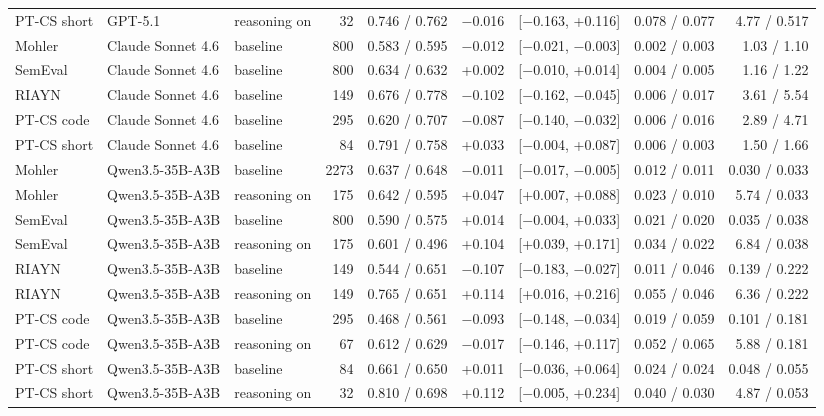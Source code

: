 \documentclass[10pt]{article}
\begin{document}
\begin{longtable}{lllrrrlrr}
PT-CS short & GPT-5.1 & reasoning on & 32 & 0.746 / 0.762 & $-$0.016 & [$-$0.163, +0.116] & 0.078 / 0.077 & 4.77 / 0.517 \\
Mohler & Claude Sonnet 4.6 & baseline & 800 & 0.583 / 0.595 & $-$0.012 & [$-$0.021, $-$0.003] & 0.002 / 0.003 & 1.03 / 1.10 \\
SemEval & Claude Sonnet 4.6 & baseline & 800 & 0.634 / 0.632 & +0.002 & [$-$0.010, +0.014] & 0.004 / 0.005 & 1.16 / 1.22 \\
RIAYN & Claude Sonnet 4.6 & baseline & 149 & 0.676 / 0.778 & $-$0.102 & [$-$0.162, $-$0.045] & 0.006 / 0.017 & 3.61 / 5.54 \\
PT-CS code & Claude Sonnet 4.6 & baseline & 295 & 0.620 / 0.707 & $-$0.087 & [$-$0.140, $-$0.032] & 0.006 / 0.016 & 2.89 / 4.71 \\
PT-CS short & Claude Sonnet 4.6 & baseline & 84 & 0.791 / 0.758 & +0.033 & [$-$0.004, +0.087] & 0.006 / 0.003 & 1.50 / 1.66 \\
Mohler & Qwen3.5-35B-A3B & baseline & 2273 & 0.637 / 0.648 & $-$0.011 & [$-$0.017, $-$0.005] & 0.012 / 0.011 & 0.030 / 0.033 \\
Mohler & Qwen3.5-35B-A3B & reasoning on & 175 & 0.642 / 0.595 & +0.047 & [+0.007, +0.088] & 0.023 / 0.010 & 5.74 / 0.033 \\
SemEval & Qwen3.5-35B-A3B & baseline & 800 & 0.590 / 0.575 & +0.014 & [$-$0.004, +0.033] & 0.021 / 0.020 & 0.035 / 0.038 \\
SemEval & Qwen3.5-35B-A3B & reasoning on & 175 & 0.601 / 0.496 & +0.104 & [+0.039, +0.171] & 0.034 / 0.022 & 6.84 / 0.038 \\
RIAYN & Qwen3.5-35B-A3B & baseline & 149 & 0.544 / 0.651 & $-$0.107 & [$-$0.183, $-$0.027] & 0.011 / 0.046 & 0.139 / 0.222 \\
RIAYN & Qwen3.5-35B-A3B & reasoning on & 149 & 0.765 / 0.651 & +0.114 & [+0.016, +0.216] & 0.055 / 0.046 & 6.36 / 0.222 \\
PT-CS code & Qwen3.5-35B-A3B & baseline & 295 & 0.468 / 0.561 & $-$0.093 & [$-$0.148, $-$0.034] & 0.019 / 0.059 & 0.101 / 0.181 \\
PT-CS code & Qwen3.5-35B-A3B & reasoning on & 67 & 0.612 / 0.629 & $-$0.017 & [$-$0.146, +0.117] & 0.052 / 0.065 & 5.88 / 0.181 \\
PT-CS short & Qwen3.5-35B-A3B & baseline & 84 & 0.661 / 0.650 & +0.011 & [$-$0.036, +0.064] & 0.024 / 0.024 & 0.048 / 0.055 \\
PT-CS short & Qwen3.5-35B-A3B & reasoning on & 32 & 0.810 / 0.698 & +0.112 & [$-$0.005, +0.234] & 0.040 / 0.030 & 4.87 / 0.053 \\

\end{longtable}
\end{document}
